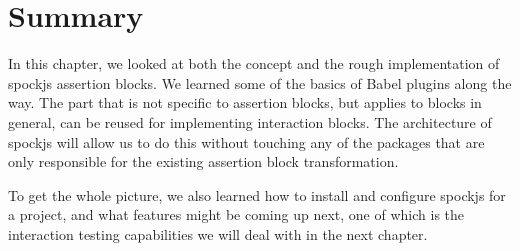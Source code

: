 \section{Summary}
In this chapter, we looked at both the concept and
the rough implementation of spockjs assertion blocks.
We learned some of the basics of Babel plugins along the way.
The part that is not specific to assertion blocks,
but applies to blocks in general,
can be reused for implementing interaction blocks.
The architecture of spockjs will allow us to do this
without touching any of the packages that are only responsible
for the existing assertion block transformation.

To get the whole picture, we also learned
how to install and configure spockjs for a project,
and what features might be coming up next,
one of which is the interaction testing capabilities
we will deal with in the next chapter.
